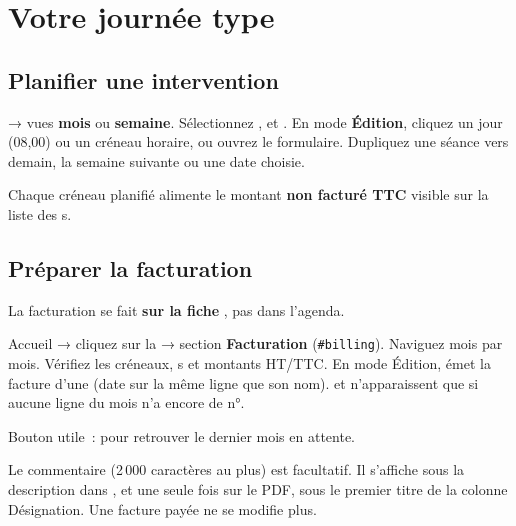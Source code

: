 
\section{Votre journée type}
\label{sec:quotidien}

\subsection{Planifier une intervention}

\begin{workflowstep}[Agenda]
   → vues \textbf{mois} ou \textbf{semaine}. Sélectionnez \structure{}, \seance{} et \patient{}. En mode \textbf{Édition}, cliquez un jour (08{,}00) ou un créneau horaire, ou ouvrez le formulaire. Dupliquez une séance vers demain, la semaine suivante ou une date choisie.
\end{workflowstep}


Chaque créneau planifié alimente le montant \textbf{non facturé TTC} visible sur la liste des \structure{}s.

\subsection{Préparer la facturation}

La facturation se fait \textbf{sur la fiche \structure{}}, pas dans l'agenda.

\begin{workflowstep}
  Accueil → cliquez sur la \structure{} → section \textbf{Facturation} (\texttt{\#billing}). Naviguez mois par mois. Vérifiez les créneaux, \patient{}s et montants HT/TTC. En mode Édition,  émet la facture d'une \seance{} (date sur la même ligne que son nom).  et  n'apparaissent que si aucune ligne du mois n'a encore de n°.
\end{workflowstep}


Bouton utile~:  pour retrouver le dernier mois en attente.

Le commentaire (2\,000 caractères au plus) est facultatif. Il s'affiche sous la description dans , et une seule fois sur le PDF, sous le premier titre de la colonne Désignation. Une facture payée ne se modifie plus.

